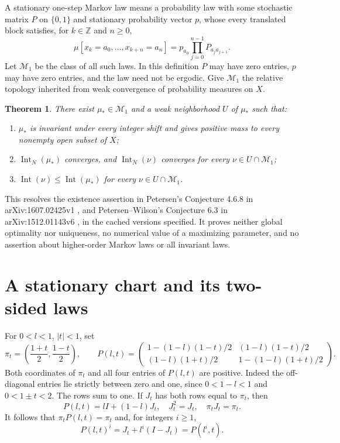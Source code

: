 \documentclass[11pt]{article}
\newtheorem{theorem}{Theorem}[section]
\newcommand{\Int}{\operatorname{Int}}
\begin{document}
A stationary one-step Markov law means a probability law with some stochastic matrix $P$ on $\{0,1\}$ and stationary probability vector $p$, whose every translated block satisfies, for $k\in\mathbb Z$ and $n\geq0$,
\begin{equation}
 \mu[x_k=a_0,\ldots,x_{k+n}=a_n]
 =p_{a_0}\prod_{j=0}^{n-1}P_{a_j a_{j+1}}.\label{block}
\end{equation}
Let $\mathcal M_1$ be the class of all such laws. In this definition $P$ may have zero entries, $p$ may have zero entries, and the law need not be ergodic. Give $\mathcal M_1$ the relative topology inherited from weak convergence of probability measures on $X$.

\begin{theorem}\label{main}
There exist $\mu_*\in\mathcal M_1$ and a weak neighborhood $U$ of $\mu_*$ such that:
\begin{enumerate}
\item $\mu_*$ is invariant under every integer shift and gives positive mass to every nonempty open subset of $X$;
\item $\Int_N(\mu_*)$ converges, and $\Int_N(\nu)$ converges for every $\nu\in U\cap\mathcal M_1$;
\item $\Int(\nu)\leq\Int(\mu_*)$ for every $\nu\in U\cap\mathcal M_1$.
\end{enumerate}
\end{theorem}
This resolves the existence assertion in Petersen's Conjecture 4.6.8 in arXiv:1607.02425v1 \cite{P}, and Petersen--Wilson's Conjecture 6.3 in arXiv:1512.01143v6 \cite{PW}, in the cached versions specified. It proves neither global optimality nor uniqueness, no numerical value of a maximizing parameter, and no assertion about higher-order Markov laws or all invariant laws.

\section{A stationary chart and its two-sided laws}
For $0<l<1$, $|t|<1$, set
\begin{equation}
 \pi_t=\left(\frac{1+t}{2},\frac{1-t}{2}\right),\qquad
 P(l,t)=\begin{pmatrix}
 1-(1-l)(1-t)/2 &(1-l)(1-t)/2\\
 (1-l)(1+t)/2&1-(1-l)(1+t)/2
 \end{pmatrix}.\label{chart}
\end{equation}
Both coordinates of $\pi_t$ and all four entries of $P(l,t)$ are positive. Indeed the off-diagonal entries lie strictly between zero and one, since $0<1-l<1$ and $0<1\pm t<2$. The rows sum to one. If $J_t$ has both rows equal to $\pi_t$, then
\[
 P(l,t)=lI+(1-l)J_t,\quad J_t^2=J_t,\quad \pi_tJ_t=\pi_t.
\]
It follows that $\pi_tP(l,t)=\pi_t$ and, for integers $i\geq1$,
\begin{equation}
 P(l,t)^i=J_t+l^i(I-J_t)=P(l^i,t).\label{powers}
\end{equation}
\end{document}

